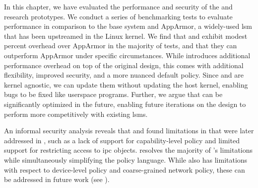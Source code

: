 In this chapter, we have evaluated the performance and security of the \bpfbox{} and
\bpfcontain{} research prototypes. We conduct a series of benchmarking tests to evaluate
performance in comparison to the base system and AppArmor, a widely-used \gls{lsm} that
has been upstreamed in the Linux kernel. We find that \bpfbox{} and \bpfcontain{} exhibit
modest percent overhead over AppArmor in the majority of tests, and that they can
outperform AppArmor under specific circumstances. While \bpfcontain{} introduces
additional performance overhead on top of the original \bpfbox{} design, this comes with
additional flexibility, improved security, and a more nuanced default policy. Since
\bpfbox{} and \bpfcontain{} are kernel agnostic, we can update them without updating the
host kernel, enabling bugs to be fixed like userspace programs. Further, we argue that
\bpfcontain{} can be significantly optimized in the future, enabling future iterations on
the design to perform more competitively with existing \glspl{lsm}.

An informal security analysis reveals that \bpfbox{} and \bpfcontain{} found limitations
in \bpfbox{} that were later addressed in \bpfcontain{}, such as a lack of support for
capability-level policy and limited support for restricting access to \gls{ipc} objects.
\bpfcontain{} resolves the majority of \bpfbox{}'s limitations while simultaneously
simplifying the policy language. While \bpfcontain{} also has limitations with respect to
device-level policy and coarse-grained network policy, these can be addressed in future
work (see ).



